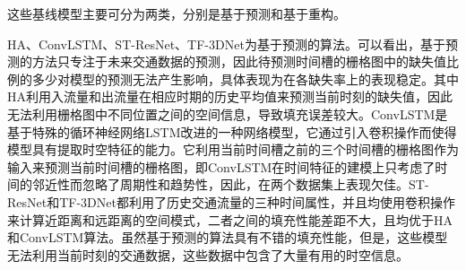 
这些基线模型主要可分为两类，分别是基于预测和基于重构。

HA、ConvLSTM、ST-ResNet、TF-3DNet为基于预测的算法。可以看出，基于预测的方法只专注于未来交通数据的预测，因此待预测时间槽的栅格图中的缺失值比例的多少对模型的预测无法产生影响，具体表现为在各缺失率上的表现稳定。其中HA利用入流量和出流量在相应时期的历史平均值来预测当前时刻的缺失值，因此无法利用栅格图中不同位置之间的空间信息，导致填充误差较大。ConvLSTM是基于特殊的循环神经网络LSTM改进的一种网络模型，它通过引入卷积操作而使得模型具有提取时空特征的能力。它利用当前时间槽之前的三个时间槽的栅格图作为输入来预测当前时间槽的栅格图，即ConvLSTM在时间特征的建模上只考虑了时间的邻近性而忽略了周期性和趋势性，因此，在两个数据集上表现欠佳。ST-ResNet和TF-3DNet都利用了历史交通流量的三种时间属性，并且均使用卷积操作来计算近距离和远距离的空间模式，二者之间的填充性能差距不大，且均优于HA和ConvLSTM算法。虽然基于预测的算法具有不错的填充性能，但是，这些模型无法利用当前时刻的交通数据，这些数据中包含了大量有用的时空信息。

